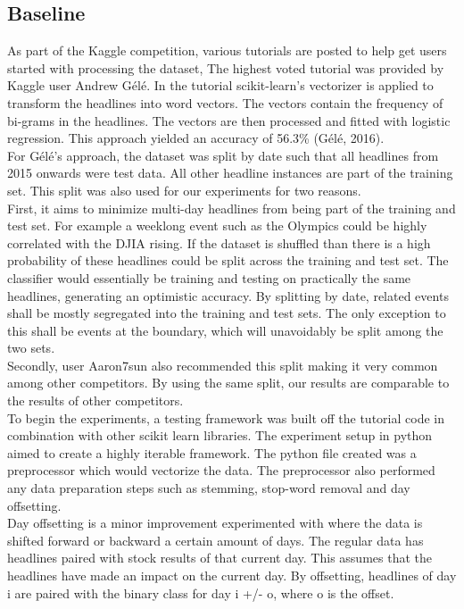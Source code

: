 \documentclass[11pt,a4paper]{article}
\begin{document}
\subsection{Baseline}
As part of the Kaggle competition, various tutorials are posted to help get users started with processing the dataset, The highest voted tutorial was provided by Kaggle user Andrew G\'el\'e. In the tutorial scikit-learn’s vectorizer is applied to transform the headlines into word vectors. The vectors contain the frequency of bi-grams in the headlines. The vectors are then processed and fitted with logistic regression. This approach yielded an accuracy of 56.3\% (G\'el\'e, 2016).\\

For G\'el\'e’s approach, the dataset was split by date such that all headlines from 2015 onwards were test data. All other headline instances are part of the training set. This split was also used for our experiments for two reasons.\\

First, it aims to minimize multi-day headlines from being part of the training and test set. For example a weeklong event such as the Olympics could be highly correlated with the DJIA rising. If the dataset is shuffled than there is a high probability of these headlines could be split across the training and test set. The classifier would essentially be training and testing on practically the same headlines, generating an optimistic accuracy. By splitting by date, related events shall be mostly segregated into the training and test sets. The only exception to this shall be events at the boundary, which will unavoidably be split among the two sets.\\

Secondly, user Aaron7sun also recommended this split making it very common among other competitors. By using the same split, our results are comparable to the results of other competitors.\\

To begin the experiments, a testing framework was built off the tutorial code in combination with other scikit learn libraries. The experiment setup in python aimed to create a highly iterable framework. The python file created was a preprocessor which would vectorize the data. The preprocessor also performed any data preparation steps such as stemming, stop-word removal and day offsetting.\\

Day offsetting is a minor improvement experimented with where the data is shifted forward or backward a certain amount of days. The regular data has headlines paired with stock results of that current day. This assumes that the headlines have made an impact on the current day. By offsetting, headlines of day i are paired with the binary class for day i +/- o, where o is the offset.\\
\end{document}
